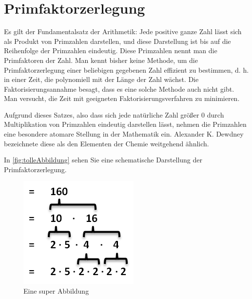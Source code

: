 \chapter{Primfaktorzerlegung}

Es gilt der Fundamentalsatz der Arithmetik: Jede positive ganze Zahl lässt sich als Produkt von Primzahlen darstellen, und diese Darstellung ist bis auf die Reihenfolge der Primzahlen eindeutig\cite{scala}. 
Diese Primzahlen nennt man die Primfaktoren der Zahl. 
Man kennt bisher keine Methode, um die Primfaktorzerlegung einer beliebigen gegebenen Zahl effizient zu bestimmen, d. h. in einer Zeit, die polynomiell mit der Länge der Zahl wächst. 
Die Faktorisierungsannahme besagt, dass es eine solche Methode auch nicht gibt. 
Man versucht, die Zeit mit geeigneten Faktorisierungsverfahren zu minimieren.

Aufgrund dieses Satzes, also dass sich jede natürliche Zahl größer 0 durch Multiplikation von Primzahlen eindeutig darstellen lässt, nehmen die Primzahlen eine besondere atomare Stellung in der Mathematik ein\cite{rltl}.
Alexander K. Dewdney bezeichnete diese als den Elementen der Chemie weitgehend ähnlich.

In \vref{fig:tolleAbbildung} sehen Sie eine schematische Darstellung der Primfaktorzerlegung.

\begin{figure}[h]
    \centering
\includegraphics[width=0.5\linewidth]{primeFac.png}

    \caption{Eine super Abbildung}
    \label{fig:tolleAbbildung}
\end{figure}

